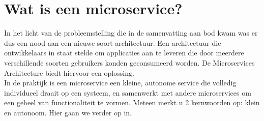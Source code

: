 \documentclass[pdftex,a4paper,12pt,twoside]{report}
\begin{document}

\section{Wat is een microservice?}
\label{sec:wat-is-een-microservice}
In het licht van de probleemstelling die in de samenvatting aan bod kwam was er dus een nood aan een nieuwe soort architectuur. Een architectuur die ontwikkelaars in staat stelde om applicaties aan te leveren die door meerdere verschillende soorten gebruikers konden geconsumeerd worden. De Microservices Architecture biedt hiervoor een oplossing. 
\\
In de praktijk is een microservice een kleine, autonome service die volledig individueel draait op een systeem, en samenwerkt met andere microservices om een geheel van functionaliteit te vormen. Meteen merkt u 2 kernwoorden op: klein en autonoom. Hier gaan we verder op in.
\\
\end{document}
